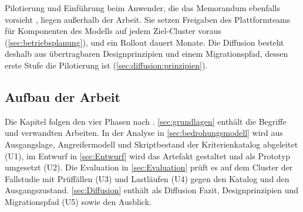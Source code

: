Pilotierung und Einführung beim Anwender, die das Memorandum ebenfalls vorsieht
\autocite[S.~668]{osterle_memorandum_2010}, liegen außerhalb der Arbeit. Sie setzen Freigaben des Plattformteams für
Komponenten des Modells auf jedem Ziel-Cluster voraus (\autoref{sec:betriebsplanung}), und ein Rollout dauert Monate. Die
Diffusion besteht deshalb aus übertragbaren Designprinzipien und einem Migrationspfad, dessen erste Stufe die
Pilotierung ist (\autoref{sec:diffusion:prinzipien}).

\subsection{Aufbau der Arbeit}
\label{sec:einleitung:aufbau}

Die Kapitel folgen den vier Phasen nach \textcite[S.~667--668]{osterle_memorandum_2010}. \autoref{sec:grundlagen}
enthält die Begriffe und verwandten Arbeiten. In der Analyse in \autoref{sec:bedrohungsmodell} wird aus Ausgangslage,
Angreifermodell und Skriptbestand der Kriterienkatalog abgeleitet (U1), im Entwurf in \autoref{sec:Entwurf} wird das
Artefakt gestaltet und als Prototyp umgesetzt (U2). Die Evaluation in \autoref{sec:Evaluation} prüft es auf dem Cluster
der Fallstudie mit Prüffällen (U3) und Lastläufen (U4) gegen den Katalog und den Ausgangszustand.
\autoref{sec:Diffusion} enthält als Diffusion Fazit, Designprinzipien und Migrationspfad (U5) sowie den Ausblick.
